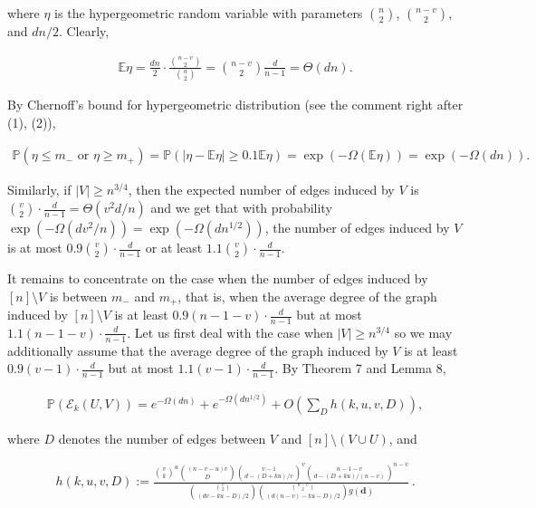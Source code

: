 where $\eta$ is the hypergeometric random variable with parameters $\binom{n}{2}$, $\binom{n-v}{2}$, and $dn/2$. Clearly,\par


\[\begin{gathered}
\mathbb{E}\eta=\frac{dn}{2}\cdot\frac{\binom{n-v}{2}}{\binom{n}{2}}={n-v\choose 2}\frac{d}{n-1}=\Theta(dn).
\end{gathered}\]


By Chernoff’s bound for hypergeometric distribution (see the comment right after (1), (2)),\par


\[\begin{gathered}
\mathbb{P}(\eta\leq m_{-}\text{ or }\eta\geq m_{+})=\mathbb{P}\left(|\eta-\mathbb{E}\eta|\geq 0.1\mathbb{E}\eta\right)=\exp\left(-\Omega\left(\mathbb{E}\eta\right)\right)=\exp(-\Omega(dn)).
\end{gathered}\]




Similarly, if $|V|\geq n^{3/4}$, then the expected number of edges induced by $V$ is $\binom{v}{2}\cdot\frac{d}{n-1}=\Theta(v^{2}d/n)$ and we get that with probability $\exp(-\Omega(dv^{2}/n))=\exp(-\Omega(dn^{1/2}))$, the number of edges induced by $V$ is at most $0.9\binom{v}{2}\cdot\frac{d}{n-1}$ or at least $1.1\binom{v}{2}\cdot\frac{d}{n-1}$.\par




It remains to concentrate on the case when the number of edges induced by $[n]\setminus V$ is between $m_{-}$ and $m_{+}$, that is, when the average degree of the graph induced by $[n]\setminus V$ is at least $0.9(n-1-v)\cdot\frac{d}{n-1}$ but at most $1.1(n-1-v)\cdot\frac{d}{n-1}$. Let us first deal with the case when $|V|\geq n^{3/4}$ so we may additionally assume that the average degree of the graph induced by $V$ is at least $0.9(v-1)\cdot\frac{d}{n-1}$ but at most $1.1(v-1)\cdot\frac{d}{n-1}$. By Theorem 7 and Lemma 8,\par


\[\begin{gathered}
\mathbb{P}(\mathcal{E}_{k}(U,V))=e^{-\Omega(dn)}+e^{-\Omega(dn^{1/2})}+O\left(\sum_{D}h(k,u,v,D)\right),
\end{gathered}\]


where $D$ denotes the number of edges between $V$ and $[n]\setminus(V\cup U)$, and\par


\[\begin{gathered}
h(k,u,v,D):=\frac{{v\choose k}^{u}{(n-v-u)v\choose D}\binom{v-1}{d-(D+ku)/v}^{v}{n-1-v\choose d-(D+ku)/(n-v)}^{n-v}}{\binom{{v\choose 2}}{(dv-ku-D)/2}{{n-v\choose 2}\choose(d(n-v)-ku-D)/2}g(\mathbf{d})}\,.
\end{gathered}\]


